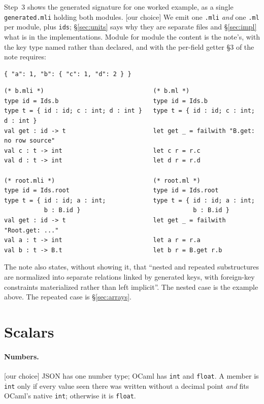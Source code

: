 \documentclass[11pt,a4paper]{article}
\newcommand{\ourcall}{\textcolor{ours}{\textsf{[our choice]}}}
\begin{document}
\noindent
Step~3 shows the generated signature for one worked example, as a single
\texttt{generated.mli} holding both modules. \ourcall{} We emit one
\texttt{.mli} \emph{and} one \texttt{.ml} per module, plus \texttt{ids}; 
\S\ref{sec:units} says why they are separate files and \S\ref{sec:impl} what
is in the implementations. Module for module the content is the note's, with
the key type named rather than declared, and with the per-field getter
\S3 of the note requires:

\begin{lstlisting}[style=json]
{ "a": 1, "b": { "c": 1, "d": 2 } }
\end{lstlisting}

\begin{lstlisting}[style=ml]
(* b.mli *)                              (* b.ml *)
type id = Ids.b                          type id = Ids.b
type t = { id : id; c : int; d : int }   type t = { id : id; c : int; d : int }
val get : id -> t                        let get _ = failwith "B.get: no row source"
val c : t -> int                         let c r = r.c
val d : t -> int                         let d r = r.d

(* root.mli *)                           (* root.ml *)
type id = Ids.root                       type id = Ids.root
type t = { id : id; a : int;             type t = { id : id; a : int;
           b : B.id }                               b : B.id }
val get : id -> t                        let get _ = failwith "Root.get: ..."
val a : t -> int                         let a r = r.a
val b : t -> B.t                         let b r = B.get r.b
\end{lstlisting}

The note also states, without showing it, that ``nested and repeated
substructures are normalized into separate relations linked by generated
keys, with foreign-key constraints materialized rather than left implicit''.
The nested case is the example above. The repeated case is \S\ref{sec:arrays}.

\section{Scalars}

\paragraph{Numbers.} \ourcall{} JSON has one number type; OCaml has
\texttt{int} and \texttt{float}. A member is \texttt{int} only if every value
seen there was written without a decimal point \emph{and} fits OCaml's native
\texttt{int}; otherwise it is \texttt{float}.
\end{document}
